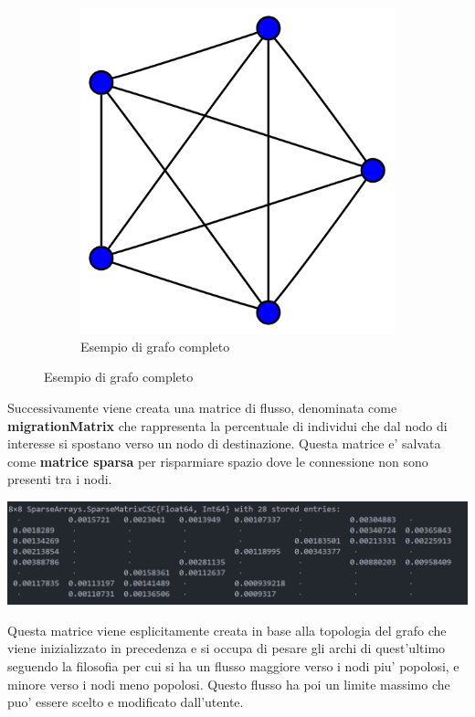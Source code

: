 \begin{figure}[!hb]
\begin{subfigure}[b]{0.45\textwidth}
		\includegraphics[width=\textwidth]{img/4-simplex_graph.svg.png}
		\caption{Esempio di grafo completo}
		\label{fig:complete_graph_example}
	\end{subfigure}
\end{figure}

Successivamente viene creata una matrice di flusso, denominata come \textbf{migrationMatrix}
che rappresenta la percentuale di individui che dal nodo di interesse si spostano verso 
un nodo di destinazione. Questa matrice e' salvata come \textbf{matrice sparsa} per risparmiare
spazio dove le connessione non sono presenti tra i nodi. 

\begin{minipage}{\linewidth}
	\centering
	\includegraphics[width=\textwidth]{img/migrationMatrix.png}
	\label{fig:migration matrix}
\end{minipage}

Questa matrice viene esplicitamente creata in base alla topologia del grafo che viene 
inizializzato in precedenza e si occupa di pesare gli archi di quest'ultimo seguendo la 
filosofia per cui si ha un flusso maggiore verso i nodi piu' popolosi, e minore verso i 
nodi meno popolosi. Questo flusso ha poi un limite massimo che puo' essere scelto e 
modificato dall'utente. 

